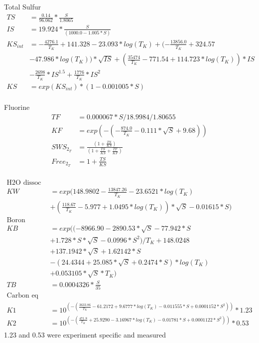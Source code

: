 \documentclass{ruthesis}
\begin{document}
Total Sulfur
\begin{align*}
 TS     	&= \frac{0.14}{96.062}*\frac{S}{1.8065} \nonumber \\
 IS     	&= 19.924*\frac{S}{(1000.0 - 1.005*S)} \nonumber \\
 KS_{int} 	&= -\frac{4276.1}{T_K} + 141.328 - 23.093*log(T_K) + (-\frac{13856.0}{T_K} + 324.57 \nonumber\\ 			 
 			& - 47.986*log(T_K))*\sqrt{IS} + ( \frac{35474}{T_K} - 771.54  + 114.723*log(T_K))*IS \nonumber \\
 			& - \frac{2698}{T_K}*IS^{1.5} + \frac{1776}{T_K}*IS^2 \nonumber \\
 KS     	&= exp(KS_{int})*(1 - 0.001005*S) \nonumber \\
\end{align*}

Fluorine
\begin{align*}
TF       	&= 0.000067*S/18.9984/1.80655 \nonumber \\
KF       	&= exp(-(-\frac{874.0}{T_K} - 0.111*\sqrt{S} + 9.68)) \nonumber \\
SWS_{2_T}  	&= \frac{(1 + \frac{TS}{KS})}{(1 + \frac{TS}{KS} + \frac{TF}{KF})} \nonumber \\
Free_{2_T} 	&= 1 + \frac{TS}{KS} \nonumber \\
\end{align*}


\begin{align*}
\text{H2O dissoc} \nonumber \\
KW 		&= exp(148.9802 - \frac{13847.26}{T_K}  - 23.6521*log(T_K) \nonumber \\
		&+ (\frac{118.67}{T_K} - 5.977 + 1.0495*log(T_K))*\sqrt{S} - 0.01615*S) \nonumber \\
\text{Boron} \nonumber \\
KB 		&= exp((-8966.90 - 2890.53*\sqrt{S} - 77.942*S \nonumber \\
		&+ 1.728*S*\sqrt{S} - 0.0996*S^2)/T_K + 148.0248 \nonumber \\
		& + 137.1942*\sqrt{S} + 1.62142*S \nonumber \\
		&- (24.4344 + 25.085*\sqrt{S} + 0.2474*S)*log(T_K)  \nonumber \\ 
		&+ 0.053105*\sqrt{S}*T_K) \nonumber \\
TB 		&= 0.0004326*\frac{S}{35} \nonumber \\
\text{Carbon eq constants} \nonumber \\
K1 		&= 10^{(-(\frac{3633.86}{T_K} - 61.2172 + 9.6777 *log(T_K) - 0.011555*S + 0.0001152*S^2))}*1.23	\nonumber \\
K2 		&= 10^{(-(\frac{471.8}{T_K} + 25.9290 - 3.16967*log(T_K) - 0.01781*S + 0.0001122*S^2))}*0.53 \nonumber \\	
\end{align*}
1.23 and 0.53 were experiment specific and measured 
\end{document}

